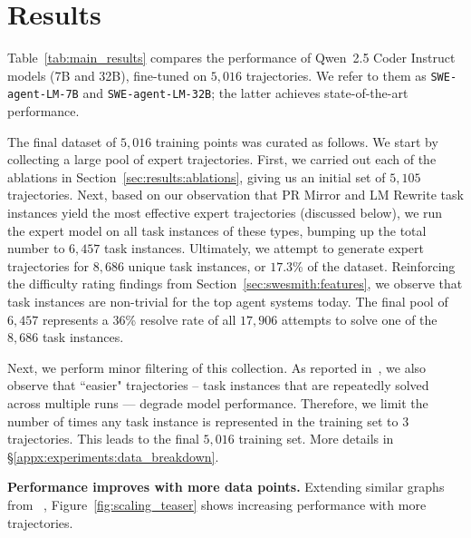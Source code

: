 \section{Results}
\label{sec:results}
Table~\ref{tab:main_results} compares the performance of Qwen~2.5 Coder Instruct models (7B and 32B), fine-tuned on $5{,}016$ \bugs{} trajectories.
We refer to them as {\tt SWE-agent-LM-7B} and {\tt SWE-agent-LM-32B}; the latter achieves state-of-the-art performance.



The final dataset of $5{,}016$ training points was curated as follows.
We start by collecting a large pool of expert trajectories.
First, we carried out each of the ablations in Section~\ref{sec:results:ablations}, giving us an initial set of $5{,}105$ trajectories.
Next, based on our observation that PR Mirror and LM Rewrite task instances yield the most effective expert trajectories (discussed below), we run the expert model on all task instances of these types, bumping up the total number to $6{,}457$ task instances.
Ultimately, we attempt to generate expert trajectories for $8{,}686$ unique task instances, or $17.3$\% of the \bugs{} dataset.
Reinforcing the difficulty rating findings from Section~\ref{sec:swesmith:features}, we observe that \bugs{} task instances are non-trivial for the top agent systems today.
The final pool of $6{,}457$ represents a $36$\% resolve rate of all $17{,}906$ attempts to solve one of the $8{,}686$ task instances.

Next, we perform minor filtering of this collection.
As reported in~\citet{pan_training_2024}, we also observe that ``easier" trajectories -- task instances that are repeatedly solved across multiple runs --- degrade model performance.
Therefore, we limit the number of times any \bugs{} task instance is represented in the training set to $3$ trajectories.
This leads to the final $5{,}016$ training set.
More details in \S\ref{appx:experiments:data_breakdown}.

\textbf{Performance improves with more data points.}
Extending similar graphs from ~\citet{jain2025r2e-gym,pan_training_2024}, Figure~\ref{fig:scaling_teaser} shows increasing performance with more trajectories.


